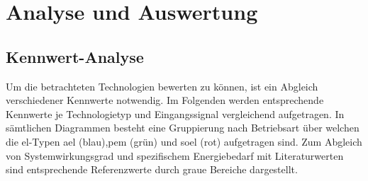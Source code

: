 \documentclass[onecolumn,10pt,titlepage]{article}
\begin{document}
\newpage
\section{Analyse und Auswertung}
\subsection{Kennwert-Analyse}
Um die betrachteten Technologien bewerten zu können, ist ein Abgleich verschiedener Kennwerte
notwendig. Im Folgenden werden entsprechende Kennwerte je Technologietyp und Eingangssignal vergleichend aufgetragen. In sämtlichen Diagrammen besteht eine Gruppierung nach Betriebsart über welchen die \gls{el}-Typen \gls{ael} (blau),\gls{pem} (grün) und \gls{soel} (rot) aufgetragen sind. Zum Abgleich von Systemwirkungsgrad und spezifischem Energiebedarf mit Literaturwerten sind entsprechende Referenzwerte durch graue Bereiche dargestellt.
\end{document}
